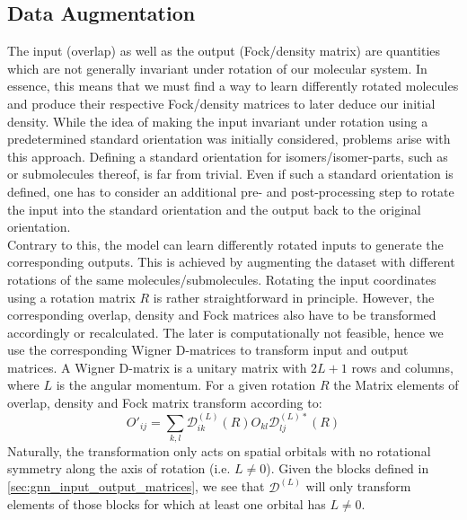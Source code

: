 \subsection{Data Augmentation}
\label{subsec:gnn_data_augmentation}
The input (overlap) as well as the output (Fock/density matrix) are quantities which are not generally invariant under rotation of our molecular system. In essence, this means that we must find a way to learn differently rotated molecules and produce their respective Fock/density matrices to later deduce our initial density. While the idea of making the input invariant under rotation using a predetermined standard orientation was initially considered, problems arise with this approach. Defining a standard orientation for isomers/isomer-parts, such as  or submolecules thereof, is far from trivial. Even if such a standard orientation is defined, one has to consider an additional pre- and post-processing step to rotate the input into the standard orientation and the output back to the original orientation. \\
Contrary to this, the model can learn differently rotated inputs to generate the corresponding outputs. This is achieved by augmenting the dataset with different rotations of the same molecules/submolecules. Rotating the input coordinates using a rotation matrix $R$ is rather straightforward in principle. However, the corresponding overlap, density and Fock matrices also have to be transformed accordingly or recalculated. The later is computationally not feasible, hence we use the corresponding Wigner D-matrices to transform input and output matrices. 
A Wigner D-matrix is a unitary matrix with $2L + 1$ rows and columns, where $L$ is the angular momentum. For a given rotation $R$ the Matrix elements of overlap, density and Fock matrix transform according to:
\begin{equation}
    \label{eq:wigner_d_transform}
    O'_{ij} = \sum_{k,l} \mathcal{D}^{(L)}_{ik}(R) O_{kl} \mathcal{D}^{(L)*}_{lj}(R)
\end{equation}
Naturally, the transformation only acts on spatial orbitals with no rotational symmetry along the axis of rotation (i.e. $L \neq 0$). Given the blocks defined in \autoref{sec:gnn_input_output_matrices}, we see that $\mathcal{D}^{(L)}$ will only transform elements of those blocks for which at least one orbital has $L \neq 0$.


